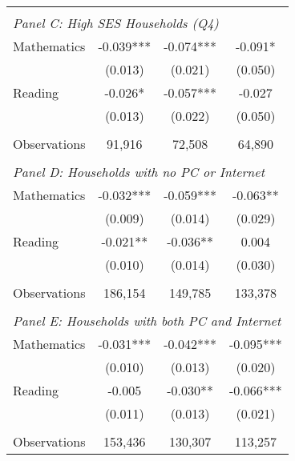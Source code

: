 {\begin{tabular}{lccc}
&  &  &   \\
\multicolumn{4}{l}{\textit{Panel C: High SES Households (Q4)}} \\
\hspace{3mm}Mathematics&      -0.039***&      -0.074***&      -0.091*  \\
                    &     (0.013)   &     (0.021)   &     (0.050)   \\
 
\hspace{3mm}Reading &      -0.026*  &      -0.057***&      -0.027   \\
                    &     (0.013)   &     (0.022)   &     (0.050)   \\
                    &               &               &               \\
\hspace{3mm}Observations&      91,916   &      72,508   &      64,890   \\
 
&  &  &   \\
\multicolumn{4}{l}{\textit{Panel D: Households with no PC or Internet}} \\
\hspace{3mm}Mathematics&      -0.032***&      -0.059***&      -0.063** \\
                    &     (0.009)   &     (0.014)   &     (0.029)   \\
 
\hspace{3mm}Reading &      -0.021** &      -0.036** &       0.004   \\
                    &     (0.010)   &     (0.014)   &     (0.030)   \\
                    &               &               &               \\
\hspace{3mm}Observations&     186,154   &     149,785   &     133,378   \\
 
&  &  &   \\
\multicolumn{4}{l}{\textit{Panel E: Households with both PC and Internet}} \\
\hspace{3mm}Mathematics&      -0.031***&      -0.042***&      -0.095***\\
                    &     (0.010)   &     (0.013)   &     (0.020)   \\
 
\hspace{3mm}Reading &      -0.005   &      -0.030** &      -0.066***\\
                    &     (0.011)   &     (0.013)   &     (0.021)   \\
                    &               &               &               \\
\hspace{3mm}Observations&     153,436   &     130,307   &     113,257   \\
 

\bottomrule
\end{tabular}
}
